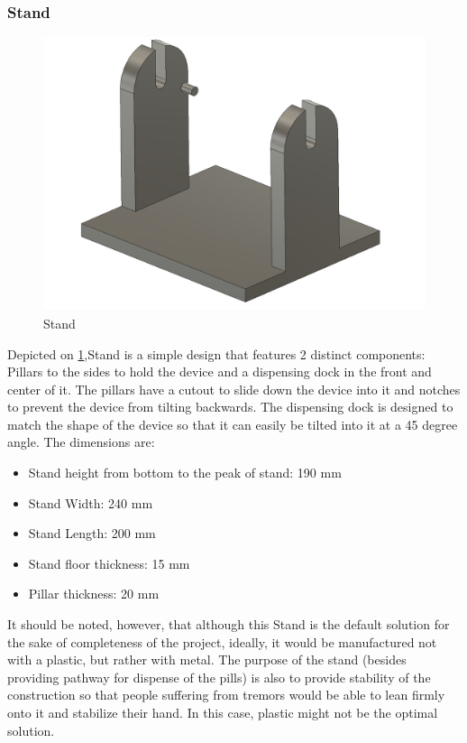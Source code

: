 \subsubsection{Stand}
\begin{figure}[h]
	\centering
	\includegraphics[width=0.7\linewidth]{Figures/Screenshot_14}
	\caption[Stand]{Stand}
	\label{fig:screenshot14}
\end{figure}
Depicted on \ref{fig:screenshot14},Stand is a simple design that features 2 distinct components: Pillars to the sides to hold the device and a dispensing dock in the front and center of it. The pillars have a cutout to slide down the device into it and notches to prevent the device from tilting backwards. The dispensing dock is designed to match the shape of the device so that it can easily be tilted into it at a 45 degree angle.
The dimensions are:
\begin{itemize}
	\item Stand height from bottom to the peak of stand: 190 mm
	\item Stand Width: 240 mm
	\item Stand Length: 200 mm
	\item Stand floor thickness: 15 mm
	\item Pillar thickness: 20 mm
\end{itemize}

It should be noted, however, that although this Stand is the default solution for the sake of completeness of the project, ideally, it would be manufactured not with a plastic, but rather with metal. The purpose of the stand (besides providing pathway for dispense of the pills) is also to provide stability of the construction so that people suffering from tremors would be able to lean firmly onto it and stabilize their hand. In this case, plastic might not be the optimal solution.
\newpage
